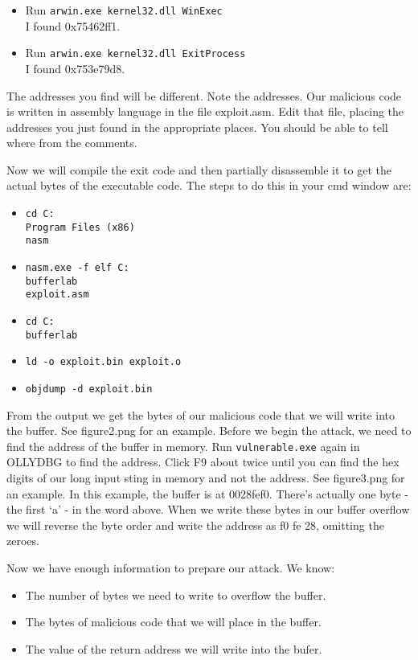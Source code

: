 \documentclass{article}
\begin{document}
\begin{itemize}
	\item Run \texttt{arwin.exe kernel32.dll WinExec} \\
		I found 0x75462ff1.
	\item Run \texttt{arwin.exe kernel32.dll ExitProcess} \\
		I found 0x753e79d8.
\end{itemize}

The addresses you find will be different.  Note the addresses. Our malicious code is written in assembly language in the file exploit.asm.  Edit that file, placing the addresses you just found in the appropriate places. You should be able to tell where from the comments.

Now we will compile the exit code and then partially disassemble it to get the actual bytes of the executable code.  The steps to do this in your cmd window are:

\begin{itemize}
	\item \texttt{cd C:\\Program Files (x86)\\nasm}
	\item \texttt{nasm.exe  -f elf C:\\bufferlab\\exploit.asm}
	\item \texttt{cd C:\\bufferlab}
	\item \texttt{ld -o exploit.bin exploit.o}
	\item \texttt{objdump -d exploit.bin}
\end{itemize}

From the output we get the bytes of our malicious code that we will write into the buffer.  See figure2.png for an example. Before we begin the attack, we need to find the address of the buffer in memory.  Run \texttt{vulnerable.exe} again in OLLYDBG to find the address. Click F9 about twice until you can find the hex digits of our long input sting in memory and not the address.  See figure3.png for an example.  In this example, the buffer is at
0028fef0.  There's actually one byte - the first `a' - in the word above. When we write these bytes in our buffer overflow we will reverse the byte order and write the address as f0 fe 28, omitting the zeroes.

Now we have enough information to prepare our attack. We know:
\begin{itemize}
	\item The number of bytes we need to write to overflow the buffer.
	\item The bytes of malicious code that we will place in the buffer.
	\item The value of the return address we will write into the bufer.
\end{itemize}
\end{document}
